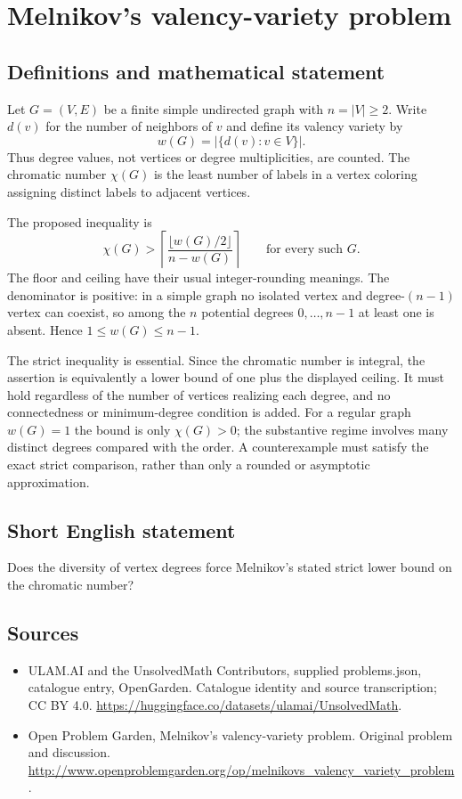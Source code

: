 \documentclass[11pt,a4paper]{article}
\begin{document}
\section*{Melnikov's valency-variety problem}\label{statement}

\subsection{Definitions and mathematical statement}
Let $G=(V,E)$ be a finite simple undirected graph with $n=|V|\ge2$. Write $d(v)$ for the number of neighbors of $v$ and define its valency variety by
\[
              w(G)=|\{d(v):v\in V\}|.
\]
Thus degree values, not vertices or degree multiplicities, are counted. The chromatic number $\chi(G)$ is the least number of labels in a vertex coloring assigning distinct labels to adjacent vertices.

The proposed inequality is
\[
 \chi(G)>\left\lceil\frac{\lfloor w(G)/2\rfloor}{n-w(G)}\right\rceil
                \qquad\text{for every such }G.
\]
The floor and ceiling have their usual integer-rounding meanings. The denominator is positive: in a simple graph no isolated vertex and degree-$(n-1)$ vertex can coexist, so among the $n$ potential degrees $0,\ldots,n-1$ at least one is absent. Hence $1\le w(G)\le n-1$.

The strict inequality is essential. Since the chromatic number is integral, the assertion is equivalently a lower bound of one plus the displayed ceiling. It must hold regardless of the number of vertices realizing each degree, and no connectedness or minimum-degree condition is added. For a regular graph $w(G)=1$ the bound is only $\chi(G)>0$; the substantive regime involves many distinct degrees compared with the order. A counterexample must satisfy the exact strict comparison, rather than only a rounded or asymptotic approximation.
\subsection{Short English statement}
Does the diversity of vertex degrees force Melnikov’s stated strict lower bound on the chromatic number?
\subsection{Sources}
\begin{itemize}
\item[S1] ULAM.AI and the UnsolvedMath Contributors, supplied problems.json, catalogue entry, OpenGarden. Catalogue identity and source transcription; CC BY 4.0.
\url{https://huggingface.co/datasets/ulamai/UnsolvedMath}.
\item[S2] Open Problem Garden, Melnikov's valency-variety problem. Original problem and discussion.
\url{http://www.openproblemgarden.org/op/melnikovs_valency_variety_problem}.
\end{itemize}
\end{document}
